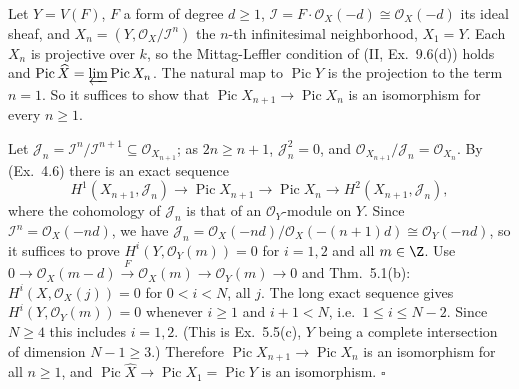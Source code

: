 \documentclass[11pt]{article}
\begin{document}
\pf
Let $Y=V(F)$, $F$ a form of degree $d\ge1$, $\mathcal I=F\cdot\mathcal O_X(-d)\cong\mathcal O_X(-d)$ its ideal sheaf, and $X_n=(Y,\mathcal O_X/\mathcal I^n)$ the $n$-th infinitesimal neighborhood, $X_1=Y$. Each $X_n$ is projective over $k$, so the Mittag-Leffler condition of (II, Ex.~9.6(d)) holds and $\operatorname{Pic}\widehat X=\varprojlim\operatorname{Pic}X_n$. The natural map to $\operatorname{Pic}Y$ is the projection to the term $n=1$. So it suffices to show that $\operatorname{Pic}X_{n+1}\to\operatorname{Pic}X_n$ is an isomorphism for every $n\ge1$.

Let $\mathcal J_n=\mathcal I^n/\mathcal I^{n+1}\subseteq\mathcal O_{X_{n+1}}$; as $2n\ge n+1$, $\mathcal J_n^2=0$, and $\mathcal O_{X_{n+1}}/\mathcal J_n=\mathcal O_{X_n}$. By (Ex.~4.6) there is an exact sequence
\[
H^1(X_{n+1},\mathcal J_n)\to\operatorname{Pic}X_{n+1}\to\operatorname{Pic}X_n\to H^2(X_{n+1},\mathcal J_n),
\]
where the cohomology of $\mathcal J_n$ is that of an $\mathcal O_Y$-module on $Y$. Since $\mathcal I^n=\mathcal O_X(-nd)$, we have $\mathcal J_n=\mathcal O_X(-nd)/\mathcal O_X(-(n+1)d)\cong\mathcal O_Y(-nd)$, so it suffices to prove $H^i(Y,\mathcal O_Y(m))=0$ for $i=1,2$ and all $m\in\Z$. Use $0\to\mathcal O_X(m-d)\xrightarrow{F}\mathcal O_X(m)\to\mathcal O_Y(m)\to0$ and Thm.~5.1(b): $H^i(X,\mathcal O_X(j))=0$ for $0<i<N$, all $j$. The long exact sequence gives $H^i(Y,\mathcal O_Y(m))=0$ whenever $i\ge1$ and $i+1<N$, i.e.\ $1\le i\le N-2$. Since $N\ge4$ this includes $i=1,2$. (This is Ex.~5.5(c), $Y$ being a complete intersection of dimension $N-1\ge3$.) Therefore $\operatorname{Pic}X_{n+1}\to\operatorname{Pic}X_n$ is an isomorphism for all $n\ge1$, and $\operatorname{Pic}\widehat X\to\operatorname{Pic}X_1=\operatorname{Pic}Y$ is an isomorphism. \hfill$\square$
\end{document}
